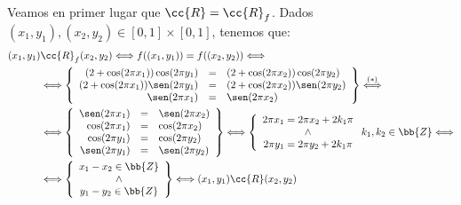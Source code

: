 \begin{ejemplo}
\begin{enumerate}
        Veamos en primer lugar que $\cc{R}=\cc{R}_f$. Dados $(x_1,y_1),(x_2,y_2)\in [0,1]\times [0,1]$, tenemos que:
        \begin{equation*}
            \begin{split}
                (x_1,y_1)&\cc{R}_f(x_2,y_2) \Longleftrightarrow f((x_1,y_1))=f((x_2,y_2)) \Longleftrightarrow \\& \Longleftrightarrow
                \left\{
                \begin{array}{rcl}
                    (2+\cos(2\pi x_1))\cos(2\pi y_1) & = & (2+\cos(2\pi x_2))\cos(2\pi y_2)  \\
                    (2+\cos(2\pi x_1))\sen(2\pi y_1) & = & (2+\cos(2\pi x_2))\sen(2\pi y_2) \\
                    \sen(2\pi x_1) & = & \sen(2\pi x_2)
                \end{array}
                \right\}
                \stackrel{(\ast)}{\Longleftrightarrow} \\& \Longleftrightarrow
                \left\{
                \begin{array}{rcl}
                     \sen(2\pi x_1) & = & \sen(2\pi x_2) \\
                     \cos(2\pi x_1) & = & \cos(2\pi x_2) \\
                     \cos(2\pi y_1) & = & \cos(2\pi y_2)\\
                     \sen(2\pi y_1) & = & \sen(2\pi y_2)
                \end{array}
                \right\}
                \Longleftrightarrow
                \left\{
                \begin{array}{c}
                     2\pi x_1 = 2\pi x_2 +2k_1\pi \\
                     \land\\
                     2\pi y_1 = 2\pi y_2 +2k_1\pi
                \end{array}
                \right. k_1,k_2\in \bb{Z} \Longleftrightarrow \\
                &\Longleftrightarrow
                \left\{
                \begin{array}{c}
                     x_1-x_2\in \bb{Z}\\
                     \land\\
                     y_1-y_2\in \bb{Z}
                \end{array}
                \right\}
                \Longleftrightarrow
                (x_1,y_1)\cc{R}(x_2,y_2)

\end{split}
\end{equation*}
\end{enumerate}
\end{ejemplo}
